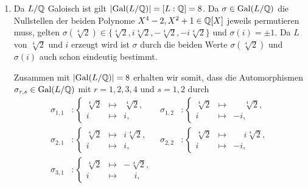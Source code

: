 \begin{solution}
\begin{enumerate}
    \item
      Da $L/\mathbb{Q}$ Galoisch ist gilt $|{\operatorname{Gal}(L / \mathbb{Q})}| = [L : \mathbb{Q}] = 8$.
      Da $\sigma \in \operatorname{Gal}(L / \mathbb{Q})$ die Nullstellen der beiden Polynome $X^4 - 2, X^2 + 1 \in \mathbb{Q}[X]$ jeweils permutieren muss, gelten $\sigma(\sqrt[4]{2}) \in \{ \sqrt[4]{2}, i\sqrt[4]{2}, -\sqrt[4]{2}, -i\sqrt[4]{2} \}$ und $\sigma(i) = \pm 1$.
      Da $L$ von $\sqrt[4]{2}$ und $i$ erzeugt wird ist $\sigma$ durch die beiden Werte $\sigma(\sqrt[4]{2})$ und $\sigma(i)$ auch schon eindeutig bestimmt.
      
      Zusammen mit $|{\operatorname{Gal}(L / \mathbb{Q})}| = 8$ erhalten wir somit, dass die Automorphismen $\sigma_{r,s} \in \operatorname{Gal}(L / \mathbb{Q})$ mit $r = 1, 2, 3, 4$ und $s = 1, 2$ durch
      \begin{align*}
        \sigma_{1,1}
        &\colon
        \left\{
          \begin{array}{rcl}
            \sqrt[4]{2} & \mapsto & \sqrt[4]{2},  \\
            i           & \mapsto & i,
          \end{array}
        \right.
        &
        \sigma_{1,2}
        &\colon
        \left\{
          \begin{array}{rcl}
            \sqrt[4]{2} & \mapsto & \phantom{-}\sqrt[4]{2},  \\
            i           & \mapsto &           -i,
          \end{array}
        \right.
        \\
        \sigma_{2,1}
        &\colon
        \left\{
          \begin{array}{rcl}
            \sqrt[4]{2} & \mapsto & i\sqrt[4]{2},  \\
            i           & \mapsto & i,
          \end{array}
        \right.
        &
        \sigma_{2,2}
        &\colon
        \left\{
          \begin{array}{rcl}
            \sqrt[4]{2} & \mapsto & \phantom{-}i\sqrt[4]{2},  \\
            i           & \mapsto &           -i,
          \end{array}
        \right.
        \\
        \sigma_{3,1}
        &\colon
        \left\{
          \begin{array}{rcl}
            \sqrt[4]{2} & \mapsto &           -\sqrt[4]{2},  \\
            i           & \mapsto & \phantom{-}i,

\end{array}
\end{align*}
\end{enumerate}
\end{solution}
